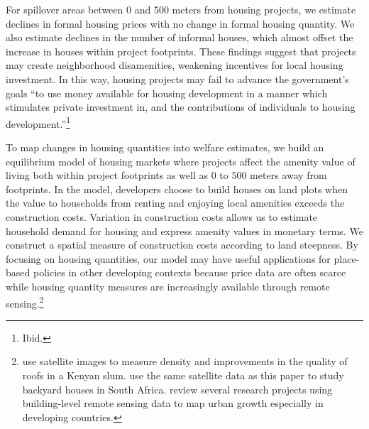 \documentclass[12pt]{article}
\begin{document}
For spillover areas between 0 and 500 meters from housing projects, we estimate declines in formal housing prices with no change in formal housing quantity.  We also estimate declines in the number of informal houses, which almost offset the increase in houses within project footprints.  These findings suggest that projects may create neighborhood disamenities, weakening incentives for local housing investment.  In this way, housing projects may fail to advance the government's goals ``to use money available for housing development in a manner which stimulates private investment in, and the contributions of individuals to housing development.''\footnote{Ibid.}




To map changes in housing quantities into welfare estimates, we build an equilibrium model of housing markets where projects affect the amenity value of living both within project footprints as well as 0 to 500 meters away from footprints.  In the model, developers choose to build houses on land plots when the value to households from renting and enjoying local amenities exceeds the construction costs.  Variation in construction costs allows us to estimate household demand for housing and express amenity values in monetary terms.  We construct a spatial measure of construction costs according to land steepness.  By focusing on housing quantities, our model may have useful applications for place-based policies in other developing contexts because price data are often scarce while housing quantity measures are increasingly available through remote sensing.\footnote{ \cite{marxthere} use satellite images to measure density and improvements in the quality of roofs in a Kenyan slum.  \cite{Brueckner2018backyarding} use the same satellite data as this paper to study backyard houses in South Africa. \cite{donaldson2016view} review several research projects using building-level remote sensing data to map urban growth especially in developing countries. }  

\end{document}
